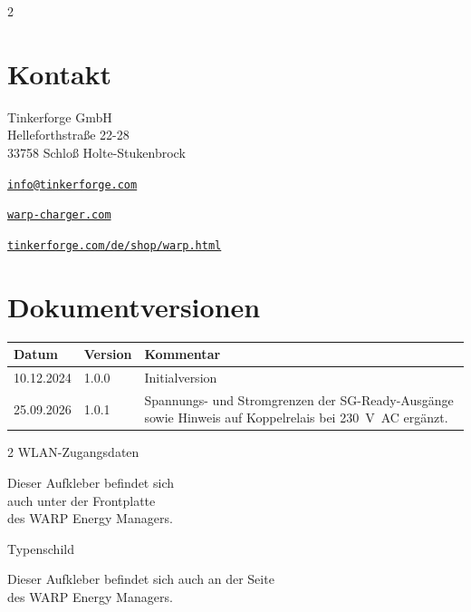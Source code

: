 \documentclass[a4paper,10pt]{article}
\begin{document}
\begin{multicols*}{2}
    \section{Kontakt}
    Tinkerforge GmbH\\ Helleforthstraße 22-28\\ 33758 Schloß Holte-Stukenbrock
    \begin{description}[leftmargin=!,labelwidth=\widthof{\textbf{Website}}]
        \item[E-Mail] \href{mailto:info@tinkerforge.com}{\texttt{info@tinkerforge.com}}
        \item[Website] \href{https://warp-charger.com}{\texttt{warp-charger.com}}
        \item[Telefon] 
        \item[Shop] \href{https://tinkerforge.com/de/shop/warp.html}{\texttt{tinkerforge.com/de/shop/warp.html}}
    \end{description}

	\section{Dokumentversionen}
	\begin{tabularx}{\linewidth}{ll>{\raggedright\arraybackslash}X}
		\toprule
		Datum      & Version & Kommentar                       \\
		\midrule
		10.12.2024 & 1.0.0   & Initialversion                  \\
		25.09.2026 & 1.0.1   & Spannungs- und Stromgrenzen der SG-Ready-Ausgänge sowie Hinweis auf Koppelrelais bei \SI{230}{\volt AC} ergänzt. \\
		\bottomrule
	\end{tabularx}

	\vfill
	\null
	\newpage

	\columnbreak

    \end{multicols*}

    \appendix

	\newpage
	\pagecolor{covergray}\afterpage{\nopagecolor}

   \begin{multicols*}{2}
    \pagestyle{empty}
    \null
    \vfill
	\color{white}
    WLAN-Zugangsdaten
    \begin{tcolorbox}[width=4.2cm,height=2.7cm, boxrule=0.25mm]

    \end{tcolorbox}
	Dieser Aufkleber befindet sich\\ auch unter der Frontplatte\\des WARP Energy
	Managers.
    \columnbreak

    \null
    \vfill
    Typenschild
    \begin{tcolorbox}[width=7.8cm,height=4.1cm, boxrule=0.25mm]

    \end{tcolorbox}
    Dieser Aufkleber befindet sich auch an der Seite\\ des WARP Energy Managers.
\end{multicols*}
\end{document}
